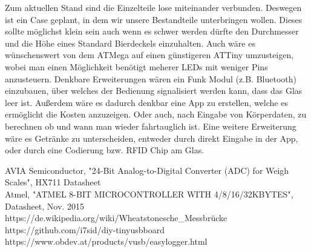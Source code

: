 \documentclass[12pt,journal]{IEEEtran}
\begin{document}
Zum aktuellen Stand sind die Einzelteile lose miteinander verbunden. Deswegen ist ein Case
geplant, in dem wir unsere Bestandteile unterbringen wollen. Dieses sollte möglichst klein sein
auch wenn es schwer werden dürfte den Durchmesser und die Höhe eines Standard Bierdeckels einzuhalten.
Auch wäre es wünschenswert von dem ATMega auf einen günstigeren ATTiny umzusteigen, wobei man einen Möglichkeit benötigt meherer LEDs mit weniger Pins anzusteuern.
Denkbare Erweiterungen wären ein Funk Modul (z.B. Bluetooth) einzubauen, über welches der Bedienung signalisiert werden kann, dass das Glas leer ist.
Außerdem wäre es dadurch denkbar eine App zu erstellen, welche es ermöglicht die Kosten anzuzeigen.
Oder auch, nach Eingabe von Körperdaten, zu berechnen ob und wann man wieder fahrtauglich ist.
Eine weitere Erweiterung wäre es Getränke zu unterscheiden, entweder durch direkt Eingabe in der App, oder durch eine Codierung bzw. RFID Chip am Glas.



%
%
%


\begin{thebibliography}{1}

AVIA Semiconductor, "24-Bit Analog-to-Digital Converter (ADC) for Weigh Scales", HX711 Datasheet
\\
Atmel, "ATMEL 8-BIT MICROCONTROLLER WITH 4/8/16/32KBYTES", Datasheet, Nov. 2015
\\
https://de.wikipedia.org/wiki/Wheatstonesche\_Messbrücke
\\
https://github.com/i7sid/diy-tinyusbboard
\\
https://www.obdev.at/products/vusb/easylogger.html


\end{thebibliography}
\end{document}

